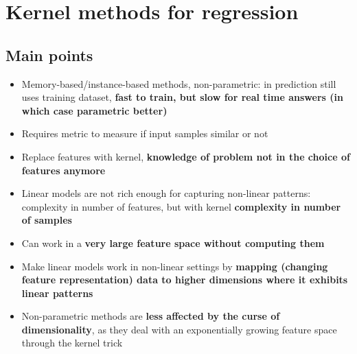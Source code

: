 
\section{Kernel methods for regression}

\subsection{Main points}
    \begin{itemize}
        \item Memory-based/instance-based methods, non-parametric: in prediction still uses training dataset, \textbf{fast to train, but slow for real time answers (in which case parametric better)}
        \item Requires metric to measure if input samples similar or not
        \item Replace features with kernel, \textbf{knowledge of problem not in the choice of features anymore}
        \item Linear models are not rich enough for capturing non-linear patterns: complexity in number of features, but with kernel \textbf{complexity in number of samples}
        \item Can work in a \textbf{very large feature space without computing them}
        \item Make linear models work in non-linear settings by \textbf{mapping (changing feature representation) data to higher dimensions where it exhibits linear patterns}
        \item Non-parametric methods are \textbf{less affected by the curse of dimensionality}, as they deal with an exponentially growing feature space through the kernel trick
    \end{itemize}

